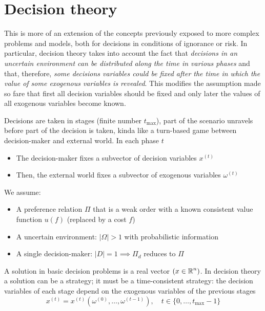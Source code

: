 \chapter{Decision theory}
\label{ch:dt}

This is more of an extension of the concepts previously exposed to more complex problems and models, both for decisions in conditions of ignorance or risk. In particular, decision theory takes into account the fact that \textit{decisions in an uncertain environment can be distributed along the time in various phases} and that, therefore, \textit{some decisions variables could be fixed after the time in which the value of some exogenous variables is revealed}. This modifies the assumption made so fare that first all decision variables should be fixed and only later the values of all exogenous variables become known.

Decisions are taken in stages (finite number $t_{\max}$), part of the scenario unravels before part of the decision is taken, kinda like a turn-based game between decision-maker and external world. In each phase $t$
\begin{itemize}
	\item The decision-maker fixes a subvector of decision variables $x^{(t)}$
	
	\item Then, the external world fixes a subvector of exogenous variables $\omega^{(t)}$
\end{itemize}

We assume:
\begin{itemize}
	\item A preference relation $\Pi$ that is a weak order with a known consistent value function $u(f)$ (replaced by a cost $f$)
	
	\item A uncertain environment: $|\Omega| > 1 $ with probabilistic information
	
	\item A single decision-maker: $|D| = 1 \implies \Pi_d$ reduces to $\Pi$
\end{itemize}

A solution in basic decision problems is a real vector $\left(x \in \operatorname{\mathbb{R}}^n\right)$. In decision theory a solution can be a strategy; it must be a time-consistent strategy: the decision variables of each stage depend on the exogenous variables of the previous stages
$$ x^{(t)} = x^{(t)} \left(\omega^{(0)}, \dots, \omega^{(t-1)}\right), \quad t \in \{0, \dots, t_{\max} - 1\} $$


